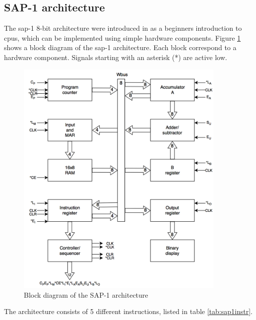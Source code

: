 \subsection{SAP-1 architecture}
\label{subsec:sap1spec}
The \gls{sap-1} 8-bit architecture were introduced in \cite{malvino1983digital} as a beginners introduction to \gls{cpu}s, which can be implemented using simple hardware components. Figure \ref{fig:sap1arch} shows a block diagram of the \gls{sap-1} architecture. Each block correspond to a hardware component. Signals starting with an asterisk (*) are active low. 
\begin{figure}[hbpt]
\centering
\includegraphics[width=0.9\textwidth]{../figs/SAP1.png}
\caption{\label{fig:sap1arch}Block diagram of the SAP-1 architecture}
\end{figure}
The architecture consists of 5 different instructions, listed in table \ref{tab:sap1instr}.

